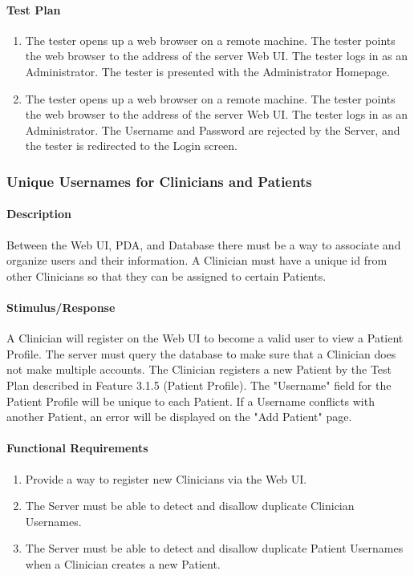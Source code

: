 \documentclass{article}
\begin{document}
\paragraph {Test Plan}
\begin{enumerate}
\item The tester opens up a web browser on a remote machine. The tester points the web browser to the address of the server Web UI. The tester logs in as an 
Administrator. The tester is presented with the Administrator Homepage. 
\item The tester opens up a web browser on a remote machine. The tester points the web browser to the address of the server Web UI. The tester logs in as an 
Administrator. The Username and Password are rejected by the Server, and the tester is redirected to the Login screen. 
\end{enumerate}

\subsubsection{Unique Usernames for Clinicians and Patients}\label{sec: Unique Usernames}

\paragraph{Description}
Between the Web UI, PDA, and Database there must be a way to associate and organize users and their information. A Clinician must have a unique id from other Clinicians so that they can be assigned to certain Patients.
\paragraph{Stimulus/Response}
A Clinician will register on the Web UI to become a valid user to view a Patient Profile. The server must query the database to make sure that a Clinician does not make multiple accounts. 
The Clinician registers a new Patient by the Test Plan described in Feature 3.1.5 (Patient Profile). The "Username" field for the Patient Profile will be unique to each Patient. If a 
Username conflicts with another Patient, an error will be displayed on the "Add Patient" page. 
\paragraph{Functional Requirements}
\begin{enumerate}
\item Provide a way to register new Clinicians via the Web UI.
\item The Server must be able to detect and disallow duplicate Clinician Usernames.
\item The Server must be able to detect and disallow duplicate Patient Usernames when a Clinician creates a new Patient. 
\end{enumerate}
\end{document}
